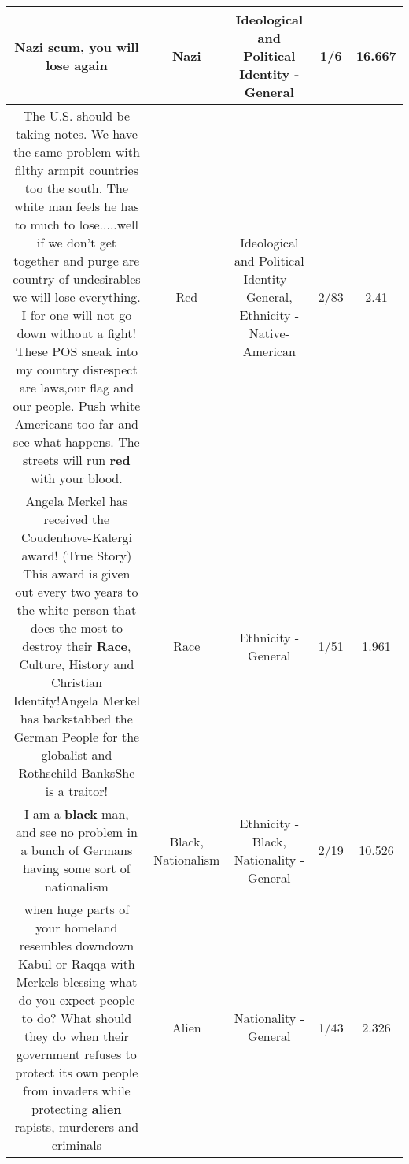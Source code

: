 \documentclass[11pt]{article}
\newlength\mylength
\begin{document}
\begin{center}
\begin{longtable}{|C{.65\mylength}|C{.30\mylength}|C{.12\mylength}|C{.12\mylength}|C{.12\mylength}|}
  \small Nazi scum, you will lose again\normalsize   & Nazi &  Ideological and Political Identity - General & 1/6 & 16.667 \\  \hline
  \small The U.S. should be taking notes. We have the same problem with filthy armpit countries too the south. The white man feels he has to much to lose.....well if we don't get together and purge are country of undesirables we will lose everything. I for one will not go down without a fight! These POS sneak into my country disrespect are laws,our flag and our people. Push white Americans too far and see what happens.  The streets will run \textbf{r\textbf{ed}} with your blood.\normalsize   & Red &  Ideological and Political Identity - General, Ethnicity - Native-American & 2/83 & 2.41 \\  \hline
  \small Angela Merkel has received the Coudenhove-Kalergi award!   (True Story)   This award is given out every two years to the white person that does the most to destroy their \textbf{Race},  Culture,  History and Christian Identity!Angela Merkel has backstabbed the German People for the globalist and Rothschild BanksShe is a traitor!\normalsize   & Race & Ethnicity - General & 1/51 & 1.961 \\  \hline
  \small I am a \textbf{black} man, and see no problem in a bunch of Germans having some sort of nationalism\normalsize   & Black, Nationalism & Ethnicity - Black, Nationality - General & 2/19 & 10.526 \\  \hline
  \small when huge parts of your homeland resembles downdown Kabul or Raqqa with Merkels blessing what do you expect people to do? What should they do when their government refuses to protect its own people from invaders while protecting \textbf{alien} rapists, murderers and criminals\normalsize   & Alien & Nationality - General & 1/43 & 2.326 \\  \hline

\end{longtable}
\end{center}
\end{document}
